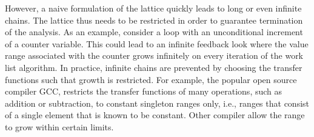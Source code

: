 However, a naive formulation of the lattice quickly leads to long or even
infinite chains. The lattice thus needs to be restricted in order to guarantee
termination of the analysis. As an example, consider a loop with an
unconditional increment of a counter variable. This could lead to an infinite
feedback look where the value range associated with the counter grows infinitely
on every iteration of the work list algorithm. In practice, infinite chains are
prevented by choosing the transfer functions such that growth is restricted. For
example, the popular open source compiler GCC, restricts the transfer functions
of many operations, such as addition or subtraction, to constant singleton
ranges only, i.e., ranges that consist of a single element that is known to be
constant. Other compiler allow the range to grow within certain limits.

